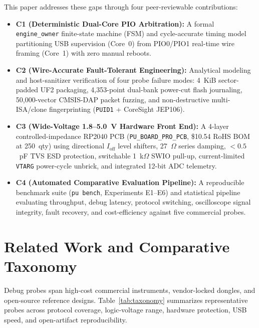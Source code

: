 \documentclass[journal]{IEEEtran}
\begin{document}
This paper addresses these gaps through four peer-reviewable contributions:
\begin{itemize}
  \item \textbf{C1 (Deterministic Dual-Core PIO Arbitration):} A formal \texttt{engine\_owner} finite-state machine (FSM) and cycle-accurate timing model partitioning USB supervision (Core~0) from PIO0/PIO1 real-time wire framing (Core~1) with zero manual reboots.
  \item \textbf{C2 (Wire-Accurate Fault-Tolerant Engineering):} Analytical modeling and host-sanitizer verification of four probe failure modes: 4~KiB sector-padded UF2 packaging, 4,353-point dual-bank power-cut flash journaling, 50,000-vector CMSIS-DAP packet fuzzing, and non-destructive multi-ISA/clone fingerprinting (\texttt{PUID1} + CoreSight JEP106).
  \item \textbf{C3 (Wide-Voltage 1.8--5.0~V Hardware Front End):} A 4-layer controlled-impedance RP2040 PCB (\texttt{PU\_BOARD\_PRO\_PCB}, \$10.54 RoHS BOM at 250~qty) using directional $I_{\text{off}}$ level shifters, 27~$\Omega$ series damping, $<0.5$~pF TVS ESD protection, switchable 1~k$\Omega$ SWIO pull-up, current-limited \texttt{VTARG} power-cycle unbrick, and integrated 12-bit ADC telemetry.
  \item \textbf{C4 (Automated Comparative Evaluation Pipeline):} A reproducible benchmark suite (\texttt{pu bench}, Experiments E1--E6) and statistical pipeline evaluating throughput, debug latency, protocol switching, oscilloscope signal integrity, fault recovery, and cost-efficiency against five commercial probes.
\end{itemize}

\section{Related Work and Comparative Taxonomy}
\label{sec:related}
Debug probes span high-cost commercial instruments, vendor-locked dongles, and open-source reference designs. Table~\ref{tab:taxonomy} summarizes representative probes across protocol coverage, logic-voltage range, hardware protection, USB speed, and open-artifact reproducibility.
\end{document}
